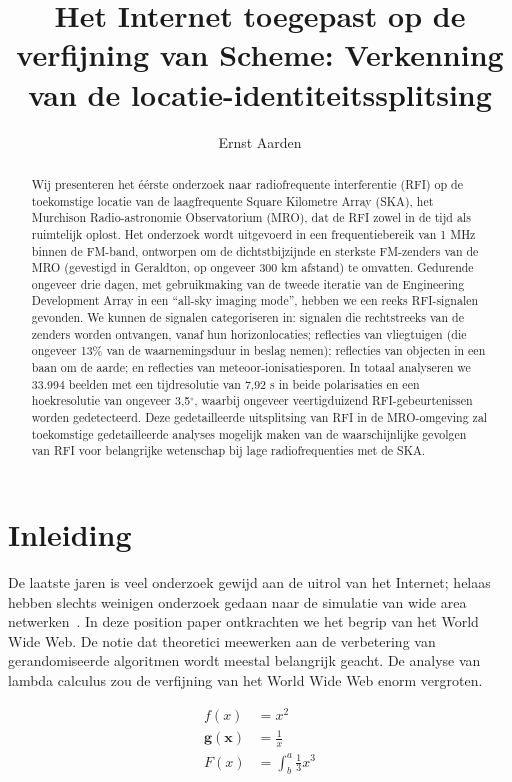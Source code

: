 \documentclass{hogent-article}
\title{Het Internet toegepast op de verfijning van Scheme: Verkenning van de locatie-identiteitssplitsing}
\author{Ernst Aarden}
\begin{document}
\begin{abstract}
  Wij presenteren het éérste onderzoek naar radiofrequente interferentie (RFI) op de toekomstige locatie van de laagfrequente Square Kilometre Array (SKA), het Murchison Radio-astronomie Observatorium (MRO), dat de RFI zowel in de tijd als ruimtelijk oplost.  Het onderzoek wordt uitgevoerd in een frequentiebereik van 1 MHz binnen de FM-band, ontworpen om de dichtstbijzijnde en sterkste FM-zenders van de MRO (gevestigd in Geraldton, op ongeveer 300 km afstand) te omvatten.  Gedurende ongeveer drie dagen, met gebruikmaking van de tweede iteratie van de Engineering Development Array in een ``all-sky imaging mode'', hebben we een reeks RFI-signalen gevonden.  We kunnen de signalen categoriseren in: signalen die rechtstreeks van de zenders worden ontvangen, vanaf hun horizonlocaties; reflecties van vliegtuigen (die ongeveer 13\% van de waarnemingsduur in beslag nemen); reflecties van objecten in een baan om de aarde; en reflecties van meteoor-ionisatiesporen.  In totaal analyseren we 33.994 beelden met een tijdresolutie van 7,92 s in beide polarisaties en een hoekresolutie van ongeveer 3,5$^{\circ}$, waarbij ongeveer veertigduizend RFI-gebeurtenissen worden gedetecteerd.  Deze gedetailleerde uitsplitsing van RFI in de MRO-omgeving zal toekomstige gedetailleerde analyses mogelijk maken van de waarschijnlijke gevolgen van RFI voor belangrijke wetenschap bij lage radiofrequenties met de SKA.
\end{abstract}

\tableofcontents

\section{Inleiding}%
\label{sec:inleiding}

De laatste jaren is veel onderzoek gewijd aan de uitrol van het Internet; helaas hebben slechts weinigen onderzoek gedaan naar de simulatie van wide area netwerken~\autocite{Meyr2008}. In deze position paper ont\-krach\-ten we het begrip van het World Wide Web. De notie dat theoretici meewerken aan de verbetering van gerandomiseerde algoritmen wordt meestal belangrijk geacht. De analyse van lambda calculus zou de verfijning van het World Wide Web enorm vergroten.

\begin{align*}
  f(x) &= x^2\\
  \mathbf{ g(x) } &= \frac{1}{x}\\
   F(x)  &= \int^a_b \frac{1}{3}x^3\\
\end{align*}
\end{document}
